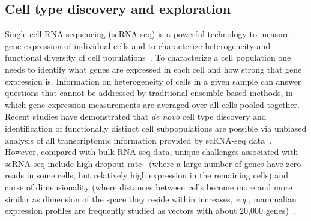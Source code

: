 \documentclass[5p]{elsarticle}
\newcommand{\eg}{\emph{e.g.}\xspace}
\newcommand{\rev}[1]{{\color{black}#1}}
\begin{document}
\subsection{Cell type discovery and exploration}

Single-cell RNA sequencing (scRNA-seq) is a powerful technology to measure \rev{gene expression of individual cells and to characterize} heterogeneity and functional diversity of cell populations~\cite{shapiro2013single}. \rev{To characterize a cell population one needs to identify what genes are expressed in each cell and how strong that gene expression is.} \rev{Information on heterogeneity of cells in a given sample} can answer questions \rev{that cannot be addressed} by traditional ensemble-based met\-hods, \rev{in which} gene expression measurements are averaged over \rev{all cells} pooled together.  Recent studies have demonstrated that {\em de novo} cell type discovery and identification of functionally distinct cell subpopulations are possible via unbiased analysis of all transcriptomic information provided by scRNA-seq data~\cite{poirion2016single}. However, compared with bulk RNA-seq data, unique challenges associated with scRNA-seq include high dropout rate~\cite{zheng2017massively} (where a large number of genes have zero reads in some cells, but relatively high expression in the remaining cells) and \rev{curse of dimensionality} (\rev{where distances between cells become more and more similar as dimension of the space they reside within increases}, \eg, \rev{mammalian} expression profiles are frequently studied as vectors with about 20,000 genes)~\cite{yuan2017challenges}. 
\end{document}
